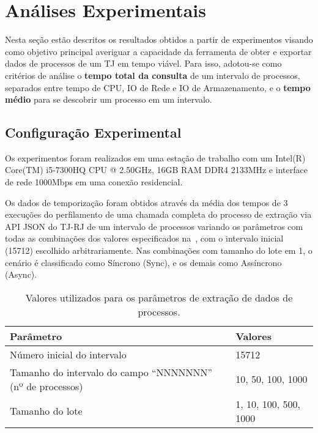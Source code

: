 \chapter{Análises Experimentais~\label{chp:Resultados-Experimentais}}

Nesta seção estão descritos os resultados obtidos a partir de experimentos
visando como objetivo principal averiguar a capacidade da ferramenta de obter e
exportar dados de processos de um TJ em tempo viável. Para isso, adotou-se como
critérios de análise o \textbf{tempo total da consulta} de
um intervalo de processos, separados entre tempo de CPU, IO de Rede e IO de
Armazenamento, e o \textbf{tempo médio} para se descobrir um processo em um
intervalo.

\section{Configuração Experimental~\label{sec:Configuração-Experimental}}

Os experimentos foram realizados em uma estação de trabalho com um Intel(R)
Core(TM) i5-7300HQ CPU @ 2.50GHz, 16GB RAM DDR4 2133MHz e interface de rede
1000Mbps em uma conexão residencial.

Os dados de temporização foram obtidos através da média dos tempos de 3
execuções do perfilamento de uma chamada completa do processo de extração via
API JSON do TJ-RJ de um intervalo de processos variando os parâmetros com todas
as combinações dos valores especificados
na~, com o intervalo inicial (15712)
escolhido arbitrariamente. Nas combinações com tamanho do lote em 1, o cenário
é classificado como Síncrono (Sync), e os demais como Assíncrono (Async).

\begin{table}[htb]
  \centering
  \begin{tabular}{ll}
    \toprule
    Parâmetro & Valores \\
    \midrule
    Número inicial do intervalo & 15712 \\
    Tamanho do intervalo do campo ``NNNNNNN'' (nº de processos) & 10, 50, 100, 1000 \\
    Tamanho do lote & 1, 10, 100, 500, 1000 \\
    \bottomrule
  \end{tabular}
  \caption{%
      Valores utilizados para os parâmetros de extração de dados de processos.
  }
  \label{tbl:parâmetros-de-perfilamento}
\end{table}

